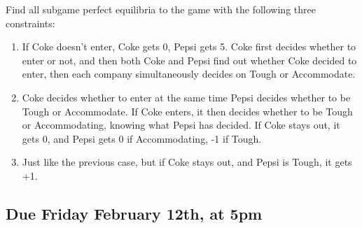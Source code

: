 \documentclass[
  11pt,
]{article}
\providecommand{\tightlist}{%
  \setlength{\itemsep}{0pt}\setlength{\parskip}{0pt}}
\begin{document}
Find all subgame perfect equilibria to the game with the following three
constraints:

\begin{enumerate}
\def\labelenumi{\arabic{enumi}.}
\tightlist
\item
  If Coke doesn't enter, Coke gets 0, Pepsi gets 5. Coke first decides
  whether to enter or not, and then both Coke and Pepsi find out whether
  Coke decided to enter, then each company simultaneously decides on
  Tough or Accommodate.
\item
  Coke decides whether to enter at the same time Pepsi decides whether
  to be Tough or Accommodate. If Coke enters, it then decides whether to
  be Tough or Accommodating, knowing what Pepsi has decided. If Coke
  stays out, it gets 0, and Pepsi gets 0 if Accommodating, -1 if Tough.
\item
  Just like the previous case, but if Coke stays out, and Pepsi is
  Tough, it gets +1.
\end{enumerate}

\hypertarget{due-friday-february-12th-at-5pm}{%
\subsection{Due Friday February 12th, at
5pm}\label{due-friday-february-12th-at-5pm}}
\end{document}
